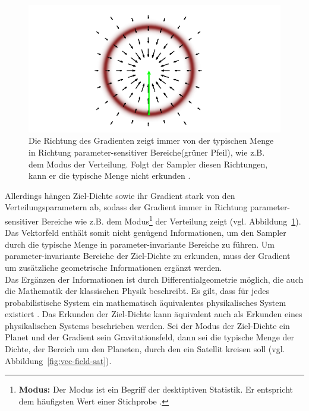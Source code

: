 \documentclass[ngerman]{ttlab-qualify}
\begin{document}
\begin{figure}[H]
\begin{center}
\includegraphics[scale=.9]{images/vector-field-grad-betancourt-2017}
\caption{Die Richtung des Gradienten zeigt immer von der typischen Menge in Richtung parameter-sensitiver Bereiche(grüner Pfeil), wie z.B. dem Modus der Verteilung. Folgt der Sampler diesen Richtungen, kann er die typische Menge nicht erkunden \parencite{betancourt:2017}.}
\label{fig:vec-field-grad}
\end{center}
\end{figure}

Allerdings hängen Ziel-Dichte sowie ihr Gradient stark von den Verteilungsparametern ab, sodass der Gradient immer in Richtung parameter-sensitiver Bereiche wie z.B. dem Modus\footnote{\textbf{Modus:} Der Modus ist ein Begriff der desktiptiven Statistik. Er entspricht dem häufigsten Wert einer Stichprobe \parencite{modus}.} der Verteilung zeigt (vgl. Abbildung~\ref{fig:vec-field-grad}).
Das Vektorfeld enthält somit nicht genügend Informationen, um den Sampler durch die typische Menge in parameter-invariante Bereiche zu führen. Um parameter-invariante Bereiche der Ziel-Dichte zu erkunden, muss der Gradient um zusätzliche geometrische Informationen ergänzt werden. \\

Das Ergänzen der Informationen ist durch Differentialgeometrie möglich, die auch die Mathematik der klassischen Physik beschreibt. Es gilt, dass für jedes probabilistische System ein mathematisch äquivalentes physikalisches System existiert \parencite{betancourt:2017}.
Das Erkunden der Ziel-Dichte kann äquivalent auch als Erkunden eines physikalischen Systems beschrieben werden. Sei der Modus der Ziel-Dichte ein Planet und der Gradient sein Gravitationsfeld, dann sei die typische Menge der Dichte, der Bereich um den Planeten, durch den ein Satellit kreisen soll (vgl. Abbildung~\ref{fig:vec-field-sat}). \\
\end{document}
